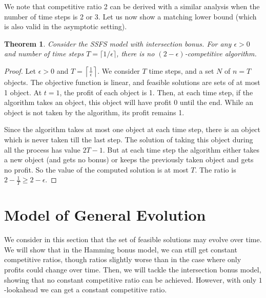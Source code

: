 \documentclass[a4paper]{book}
\newtheorem{theorem}{Theorem}[chapter]
\newtheorem{proof}{\noindent{\bf Proof.} }
\begin{document}
We note that competitive ratio 2 can be derived with a similar analysis when 
the number of time steps is 2 or 3. Let us now show a matching lower bound (which is also valid in the asymptotic setting).

\begin{theorem}\label{thm:static-intersection-lower}
Consider the SSFS model with intersection bonus. For any $\epsilon>0$ and number of time steps $T=\lceil1/\epsilon\rceil$, there is no $(2-\epsilon)$-competitive algorithm.
\end{theorem}

\begin{proof}
Let $\epsilon>0$ and $T=\left\lceil \frac{1}{\epsilon}\right\rceil$. We consider $T$ time steps,  and a set $N$ of $n=T$ objects. The objective function is linear, and feasible solutions are sets of at most 1 object. At $t=1$, the profit of each object is 1. Then, at each time step, if the algorithm takes an object, this object will have profit 0 until the end. While an object is not taken by the algorithm, its profit remains 1.

Since the algorithm takes at most one object at each time step, there is an object which is never taken till the last step. The solution of taking this object during all the process has value $2T-1$. But at each time step the algorithm either takes a new object (and gets no bonus) or keeps the previously taken object and gets no profit. So the value of the computed solution is at most $T$. The ratio is $2-\frac{1}{T}\geq 2-\epsilon$. %
\end{proof}


\section{Model of General Evolution}\label{sec:general}

We consider in this section that the  set of feasible solutions may evolve over time. We will show that in the Hamming bonus model, we can still get constant competitive ratios, though ratios slightly worse than in the case where only profits could change over time. Then, we will tackle the intersection bonus model, showing that no constant competitive ratio can be achieved. However, with only $1$-lookahead we can get a constant competitive ratio.
\end{document}
